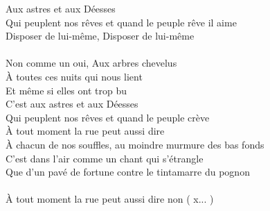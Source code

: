 \documentclass[11pt]{article}
\begin{document}
Aux astres et aux Déesses \\
Qui peuplent nos rêves et quand le peuple rêve il aime \\
Disposer de lui-même, Disposer de lui-même \\
\\
Non comme un oui, Aux arbres chevelus \\
À toutes ces nuits qui nous lient \\
Et même si elles ont trop bu \\
C'est aux astres et aux Déesses \\
Qui peuplent nos rêves et quand le peuple crève \\
À tout moment la rue peut aussi dire \\
À chacun de nos souffles, au moindre murmure des bas fonds \\
C'est dans l'air comme un chant qui s'étrangle \\
Que d'un pavé de fortune contre le tintamarre du pognon \\
\\
À tout moment la rue peut aussi dire non ( x... )\\
 \\
\end{document}
